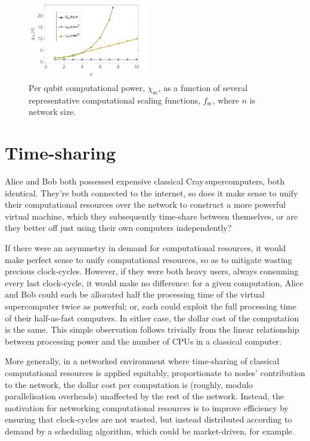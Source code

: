 \begin{figure}[htb!]
	\includegraphics[clip=true, width=0.475\textwidth]{network_price_scaling_factor}
	\captionspacefig \caption{Per qubit computational power, $\chi_\mathrm{sc}$, as a function of several representative computational scaling functions, $f_\mathrm{sc}$, where $n$ is network size.} \label{fig:NPSF}
\end{figure}

%
%

\section{Time-sharing}\label{sec:time_share}

 Alice and Bob both possessed expensive classical Cray\texttrademark\,supercomputers, both identical. They're both connected to the internet, so does it make sense to unify their computational resources over the network to construct a more powerful virtual machine, which they subsequently time-share between themselves, or are they better off just using their own computers independently?

If there were an asymmetry in demand for computational resources, it would make perfect sense to unify computational resources, so as to mitigate wasting precious clock-cycles. However, if they were both heavy users, always consuming every last clock-cycle, it would make no difference: for a given computation, Alice and Bob could each be allocated half the processing time of the virtual supercomputer twice as powerful; or, each could exploit the full processing time of their half-as-fast computers. In either case, the dollar cost of the computation is the same. This simple observation follows trivially from the linear relationship between processing power and the number of CPUs in a classical computer.

More generally, in a networked environment where time-sharing of classical computational resources is applied equitably, proportionate to nodes' contribution to the network, the dollar cost per computation is (roughly, modulo parallelisation overheads) unaffected by the rest of the network. Instead, the motivation for networking computational resources is to improve efficiency by ensuring that clock-cycles are not wasted, but instead distributed according to demand by a scheduling algorithm, which could be market-driven, for example.

